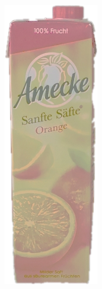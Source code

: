 \begin{appendices}
\begin{figure}[htb]
\begin{minipage}[c]{0.2\textwidth}
\end{minipage}
\hfill
\begin{minipage}[c]{0.08\textwidth}
\includegraphics[width=\textwidth]{Sources/Bild2_HS.png}

\end{minipage}
\end{figure}
\end{appendices}

